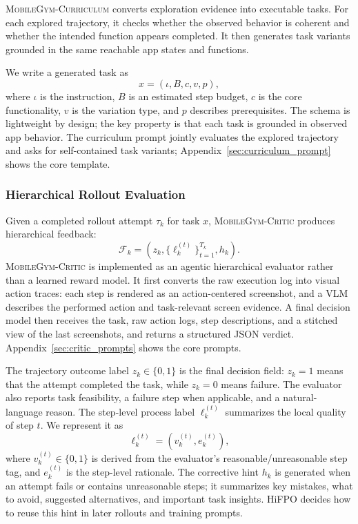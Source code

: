 \documentclass{llmxive}
\providecommand{\curriculum}{\textsc{MobileGym-Curriculum}\xspace}
\providecommand{\critic}{\textsc{MobileGym-Critic}\xspace}
\providecommand{\hifpo}{HiFPO\xspace}
\begin{document}
\curriculum converts exploration evidence into executable tasks. For each explored trajectory, it checks whether the observed behavior is coherent and whether the intended function appears completed. It then generates task variants grounded in the same reachable app states and functions.

We write a generated task as
\begin{equation}
    x=(\iota,B,c,v,p),
\end{equation}
where $\iota$ is the instruction, $B$ is an estimated step budget, $c$ is the core functionality, $v$ is the variation type, and $p$ describes prerequisites. The schema is lightweight by design; the key property is that each task is grounded in observed app behavior.
The curriculum prompt jointly evaluates the explored trajectory and asks for self-contained task variants; Appendix~\ref{sec:curriculum_prompt} shows the core template.

\subsubsection{Hierarchical Rollout Evaluation}
\label{sec:evaluation}

Given a completed rollout attempt $\tau_k$ for task $x$, \critic produces hierarchical feedback:
\begin{equation}
\label{eq:feedback-object}
    \mathcal{F}_{k}
    =\left(z_{k},\{\ell_k^{(t)}\}_{t=1}^{T_k},h_k\right).
\end{equation}
\critic is implemented as an agentic hierarchical evaluator rather than a learned reward model. It first converts the raw execution log into visual action traces: each step is rendered as an action-centered screenshot, and a VLM describes the performed action and task-relevant screen evidence. A final decision model then receives the task, raw action logs, step descriptions, and a stitched view of the last screenshots, and returns a structured JSON verdict. Appendix~\ref{sec:critic_prompts} shows the core prompts.

The trajectory outcome label $z_k\in\{0,1\}$ is the final decision field: $z_k=1$ means that the attempt completed the task, while $z_k=0$ means failure. The evaluator also reports task feasibility, a failure step when applicable, and a natural-language reason. The step-level process label $\ell_k^{(t)}$ summarizes the local quality of step $t$. We represent it as
\begin{equation}
\label{eq:process-label}
    \ell_k^{(t)}=(v_k^{(t)},e_k^{(t)}),
\end{equation}
where $v_k^{(t)}\in\{0,1\}$ is derived from the evaluator's reasonable/unreasonable step tag, and $e_k^{(t)}$ is the step-level rationale. The corrective hint $h_k$ is generated when an attempt fails or contains unreasonable steps; it summarizes key mistakes, what to avoid, suggested alternatives, and important task insights. \hifpo decides how to reuse this hint in later rollouts and training prompts.
\end{document}
